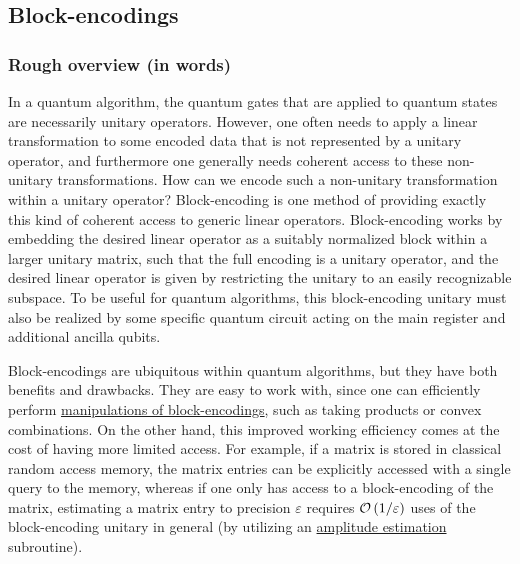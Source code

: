 \newpage







\begin{refsection}

\subsection{Block-encodings}\label{prim:BlockEncodings}

\subsubsection*{Rough overview (in words)}
In a quantum algorithm, the quantum gates that are applied to quantum states are necessarily unitary operators. However, one often needs to apply a linear transformation to some encoded data that is not represented by a unitary operator, and furthermore one generally needs coherent access to these non-unitary transformations. How can we encode such a non-unitary transformation within a unitary operator? Block-encoding is one method of providing exactly this kind of coherent access to generic linear operators. Block-encoding works by embedding the desired linear operator as a suitably normalized block within a larger unitary matrix, such that the full encoding is a unitary operator, and the desired linear operator is given by restricting the unitary to an easily recognizable subspace. To be useful for quantum algorithms, this block-encoding unitary must also be realized by some specific quantum circuit acting on the main register and additional ancilla qubits. 

Block-encodings are ubiquitous within quantum algorithms, but they have both benefits and drawbacks. They are easy to work with, since one can efficiently perform \hyperref[prim:ManipulatingBlockEncodings]{manipulations of block-encodings}, such as taking products or convex combinations. On the other hand, this improved working efficiency comes at the cost of having more limited access. For example, if a matrix is stored in classical random access memory, the matrix entries can be explicitly accessed with a single query to the memory, whereas if one only has access to a block-encoding of the matrix, estimating a matrix entry to precision $\varepsilon$ requires $\mathcal{O}\left( 1/\varepsilon \right)$ uses of the block-encoding unitary in general (by utilizing an \hyperref[prim:AmpEst]{amplitude estimation} subroutine). 


\end{refsection}

